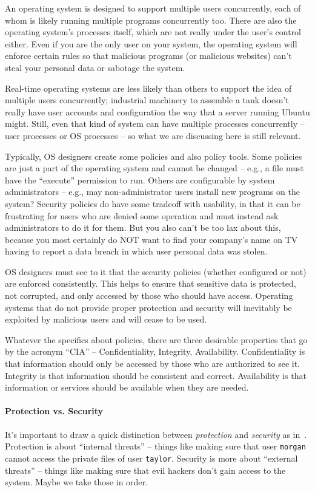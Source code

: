 An operating system is designed to support multiple users concurrently, each of whom is likely running multiple programs concurrently too. There are also the operating system's processes itself, which are not really under the user's control either. Even if you are the only user on your system, the operating system will enforce certain rules so that malicious programs (or malicious websites) can't steal your personal data or sabotage the system. 

Real-time operating systems are less likely than others to support the idea of multiple users concurrently; industrial machinery to assemble a tank doesn't really have user accounts and configuration the way that a server running Ubuntu might. Still, even that kind of system can have multiple processes concurrently -- user processes or OS processes -- so what we are discussing here is still relevant. 

Typically, OS designers create some policies and also policy tools. Some policies are just a part of the operating system and cannot be changed -- e.g., a file must have the ``execute'' permission to run. Others are configurable by system administrators -- e.g., may non-administrator users install new programs on the system? Security policies do have some tradeoff with usability, in that it can be frustrating for users who are denied some operation and must instead ask administrators to do it for them. But you also can't be too lax about this, because you most certainly do NOT want to find your company's name on TV having to report a data breach in which user personal data was stolen.

OS designers must see to it that the security policies (whether configured or not) are enforced consistently. This helps to ensure that sensitive data is protected, not corrupted, and only accessed by those who should have access. Operating systems that do not provide proper protection and security will inevitably be exploited by malicious users and will cease to be used. 

Whatever the specifics about policies, there are three desirable properties that go by the acronym ``CIA'' -- Confidentiality, Integrity, Availability. Confidentiality is that information should only be accessed by those who are authorized to see it. Integrity is that information should be consistent and correct. Availability is that information or services should be available when they are needed.

\paragraph{Protection vs. Security} It's important to draw a quick distinction between \textit{protection} and \textit{security} as in~\cite{osc}. Protection is about ``internal threats'' -- things like making sure that user \texttt{morgan} cannot access the private files of user \texttt{taylor}. Security is more about ``external threats'' -- things like making sure that evil hackers don't gain access to the system. Maybe we take those in order.

